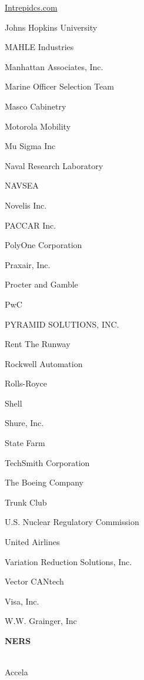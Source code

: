 \documentclass[twoside]{article}
\begin{document}
\begin{center}
\begin{multicols}{5}
\begin{FlushLeft}
\begin{compactitem}
\item \url{Intrepidcs.com}
\item Johns Hopkins University
\item MAHLE Industries
\item Manhattan Associates, Inc.
\item Marine Officer Selection Team
\item Masco Cabinetry
\item Motorola Mobility
\item Mu Sigma Inc
\item Naval Research Laboratory
\item NAVSEA
\item Novelis Inc.
\item PACCAR Inc.
\item PolyOne Corporation
\item Praxair, Inc.
\item Procter and Gamble
\item PwC
\item PYRAMID SOLUTIONS, INC.
\item Rent The Runway
\item Rockwell Automation
\item Rolls-Royce
\item Shell
\item Shure, Inc.
\item State Farm
\item TechSmith Corporation
\item The Boeing Company
\item Trunk Club
\item U.S. Nuclear Regulatory Commission
\item United Airlines
\item Variation Reduction Solutions, Inc.
\item Vector CANtech
\item Visa, Inc.
\item W.W. Grainger, Inc
\end{compactitem}
        \end{FlushLeft}
        \vspace{1em}
        {\fontsize{14}{16}\selectfont \bf NERS}\\
        \vspace{-1em}
        ~\hrulefill~
        \vspace{-.9em}
        \begin{FlushLeft}
        \begin{compactitem}
        \item Accela

\end{compactitem}
\end{FlushLeft}
\end{multicols}
\end{center}
\end{document}
